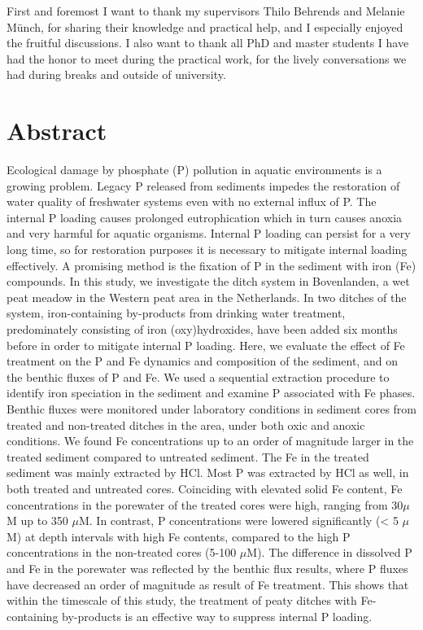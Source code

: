 \documentclass[a4paper,11pt]{article}
\begin{document}
First and foremost I want to thank my supervisors Thilo Behrends and Melanie Münch, for sharing their knowledge and practical help, and I especially enjoyed the fruitful discussions. I also want to thank all PhD and master students I have had the honor to meet during the practical work, for the lively conversations we had during breaks and outside of university.
\pagestyle{plain}
\setcounter{page}{1}    %

\newpage
\hypertarget{abstract}{%
\section*{Abstract}\label{abstract}}

Ecological damage by phosphate (P) pollution in aquatic environments is a growing problem. Legacy P released from sediments impedes the restoration of water quality of freshwater systems even with no external influx of P. The internal P loading causes prolonged eutrophication which in turn causes anoxia and very harmful for aquatic organisms. Internal P loading can persist for a very long time, so for restoration purposes it is necessary to mitigate internal loading effectively. A promising method is the fixation of P in the sediment with iron (Fe) compounds. In this study, we investigate the ditch system in Bovenlanden, a wet peat meadow in the Western peat area in the Netherlands. In two ditches of the system, iron-containing by-products from drinking water treatment, predominately consisting of iron (oxy)hydroxides, have been added six months before in order to mitigate internal P loading. Here, we evaluate the effect of Fe treatment on the P and Fe dynamics and composition of the sediment, and on the benthic fluxes of P and Fe. We used a sequential extraction procedure to identify iron speciation in the sediment and examine P associated with Fe phases. Benthic fluxes were monitored under laboratory conditions in sediment cores from treated and non-treated ditches in the area, under both oxic and anoxic conditions. We found Fe concentrations up to an order of magnitude larger in the treated sediment compared to untreated sediment. The Fe in the treated sediment was mainly extracted by HCl. Most P was extracted by HCl as well, in both treated and untreated cores. Coinciding with elevated solid Fe content, Fe concentrations in the porewater of the treated cores were high, ranging from 30\(\mu\)M up to 350 \(\mu\)M. In contrast, P concentrations were lowered significantly (\textless{} 5 \(\mu\)M) at depth intervals with high Fe contents, compared to the high P concentrations in the non-treated cores (5-100 \(\mu\)M). The difference in dissolved P and Fe in the porewater was reflected by the benthic flux results, where P fluxes have decreased an order of magnitude as result of Fe treatment. This shows that within the timescale of this study, the treatment of peaty ditches with Fe-containing by-products is an effective way to suppress internal P loading.
\end{document}

